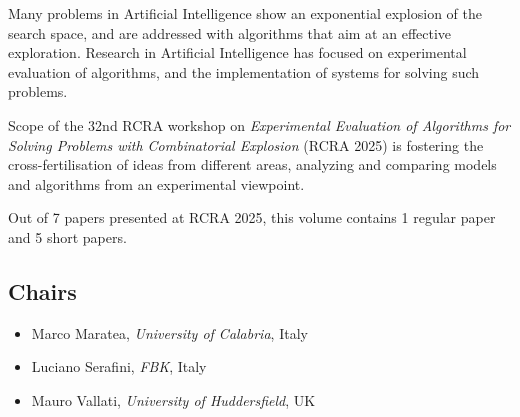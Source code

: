 \documentclass[
]{ceurart}
\begin{document}
\maketitle


\noindent
Many problems in Artificial Intelligence show an exponential explosion of the search space, and are addressed with algorithms that aim at an effective exploration.  Research in Artificial Intelligence has focused on experimental evaluation of algorithms, and the implementation of systems for solving such problems.

 

Scope of the 32nd RCRA workshop on \emph{Experimental Evaluation of Algorithms for Solving Problems with Combinatorial Explosion} (RCRA 2025) is fostering the cross-fertilisation of ideas from different areas, analyzing and comparing models and algorithms from an experimental viewpoint.

 

Out of 7 papers presented at RCRA 2025, this volume contains 1 regular paper and 5 short papers.

\subsection*{Chairs}
\begin{itemize}
  \item Marco Maratea, \emph{University of Calabria}, Italy
  \item Luciano Serafini, \emph{FBK}, Italy
  \item Mauro Vallati, \emph{University of Huddersfield}, UK
\end{itemize}
\end{document}
